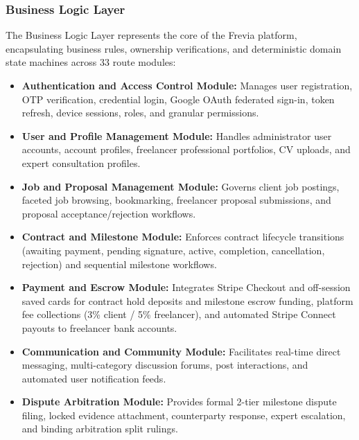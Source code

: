 \subsubsection*{Business Logic Layer}
The Business Logic Layer represents the core of the Frevia platform, encapsulating business rules, ownership verifications, and deterministic domain state machines across 33 route modules:
\begin{itemize}[leftmargin=*]
    \item \textbf{Authentication and Access Control Module:} Manages user registration, OTP verification, credential login, Google OAuth federated sign-in, token refresh, device sessions, roles, and granular permissions.
    \item \textbf{User and Profile Management Module:} Handles administrator user accounts, account profiles, freelancer professional portfolios, CV uploads, and expert consultation profiles.
    \item \textbf{Job and Proposal Management Module:} Governs client job postings, faceted job browsing, bookmarking, freelancer proposal submissions, and proposal acceptance/rejection workflows.
    \item \textbf{Contract and Milestone Module:} Enforces contract lifecycle transitions (awaiting payment, pending signature, active, completion, cancellation, rejection) and sequential milestone workflows.
    \item \textbf{Payment and Escrow Module:} Integrates Stripe Checkout and off-session saved cards for contract hold deposits and milestone escrow funding, platform fee collections (3\% client / 5\% freelancer), and automated Stripe Connect payouts to freelancer bank accounts.
    \item \textbf{Communication and Community Module:} Facilitates real-time direct messaging, multi-category discussion forums, post interactions, and automated user notification feeds.
    \item \textbf{Dispute Arbitration Module:} Provides formal 2-tier milestone dispute filing, locked evidence attachment, counterparty response, expert escalation, and binding arbitration split rulings.
\end{itemize}

